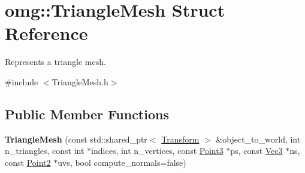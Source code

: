 \hypertarget{structomg_1_1_triangle_mesh}{}\section{omg\+::Triangle\+Mesh Struct Reference}
\label{structomg_1_1_triangle_mesh}


Represents a triangle mesh.  




{\ttfamily \#include $<$Triangle\+Mesh.\+h$>$}

\subsection*{Public Member Functions}
\begin{DoxyCompactItemize}
\item 
\mbox{\label{structomg_1_1_triangle_mesh_abe293caea32a558183996122da8fd135}} 
{\bfseries Triangle\+Mesh} (const std\+::shared\+\_\+ptr$<$ \mbox{\hyperlink{classomg_1_1_transform}{Transform}} $>$ \&object\+\_\+to\+\_\+world, int n\+\_\+triangles, const int $\ast$indices, int n\+\_\+vertices, const \mbox{\hyperlink{namespaceomg_af85242d35fdacf829d32a6f9b95f3e35}{Point3}} $\ast$ps, const \mbox{\hyperlink{namespaceomg_a45a9482677fee9933ff369b49894e316}{Vec3}} $\ast$ns, const \mbox{\hyperlink{namespaceomg_a18e42fb7bbc4159e9137145b866ec578}{Point2}} $\ast$uvs, bool compute\+\_\+normals=false)
\end{DoxyCompactItemize}
